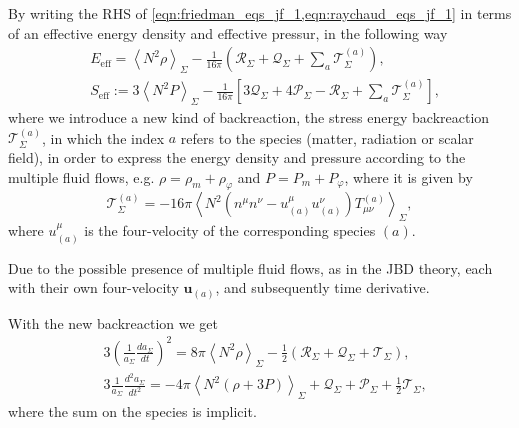 By writing the RHS of \cref{eqn:friedman_eqs_jf_1,eqn:raychaud_eqs_jf_1} in terms of an effective energy density and effective pressur, in the following way
\begin{align}
    &E_{\mathrm{eff}} = \left\langle N^2 \rho\right\rangle_{\Sigma}-\frac{1}{16\pi}\left(\mathcal{R}_\Sigma+\mathcal{Q}_{\Sigma}+\sum_a \mathcal{T}^{(a)}_{\Sigma}\right),\\
    &S_{\mathrm{eff}}:=3\left\langle N^2 P\right\rangle_{\Sigma}-\frac{1}{16\pi}\left[3\mathcal{Q}_{\Sigma}+4\mathcal{P}_{\Sigma}-\mathcal{R}_\Sigma+\sum_a\mathcal{T}^{(a)}_{\Sigma}\right],
\end{align}
where we introduce a new kind of backreaction, the stress energy backreaction $\mathcal{T}^{(a)}_\Sigma$, in which the index $a$ refers to the species (matter, radiation or scalar field), in order to express the energy density and pressure according to the multiple fluid flows, e.g. $\rho=\rho_m+\rho_\varphi$ and $P=P_m+P_\varphi$, where it is given by
\begin{equation}
    \mathcal{T}^{(a)}_{\Sigma}=-16\pi\left\langle N^2\left(n^\mu n^\nu-u^\mu_{(a)} u^\nu_{(a)}\right)T_{\mu\nu}^{(a)}\right\rangle_\Sigma,
\end{equation}
where $u_{(a)}^\mu$ is the four-velocity of the corresponding species $(a)$.

Due to the possible presence of multiple fluid flows, as in the JBD theory, each with their own four-velocity $\mathbf{u}_{(a)}$, and subsequently time derivative. 

With the new backreaction we get
\begin{align}
    &3\left(\frac{1}{a_\Sigma}\frac{da_\Sigma}{dt}\right)^2=8\pi\left\langle N^2\rho\right\rangle_{\Sigma}-\frac{1}{2}\left(\mathcal{R}_\Sigma+\mathcal{Q}_{\Sigma}+\mathcal{T}_{\Sigma}\right),\label{eqn:friedman_eqs_jf_2}\\
    &3\frac{1}{a_{\Sigma}}\frac{d^2a_{\Sigma}}{dt^2}=-4\pi\left\langle N^2(\rho+3P)\right\rangle_{\Sigma}+\mathcal{Q}_{\Sigma}+\mathcal{P}_{\Sigma}+\frac{1}{2}\mathcal{T}_{\Sigma}\label{eqn:raychaud_eqs_jf_2},
\end{align}
where the sum on the species is implicit.

